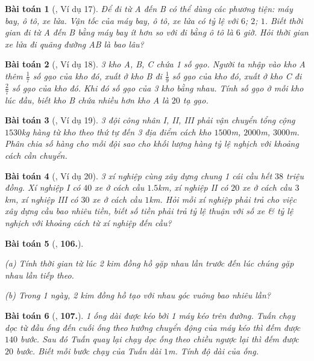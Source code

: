 \documentclass{article}
\numberwithin{equation}{section}
\newtheorem{baitoan}{Bài toán}
\begin{document}
\begin{baitoan}[\cite{Binh_Toan_7_tap_1}, Ví dụ 17]
	Để đi từ A đến B có thể dùng các phương tiện: máy bay, ô tô, xe lửa. Vận tốc của máy bay, ô tô, xe lửa có tỷ lệ với $6$; $2$; $1$. Biết thời gian đi từ A đến B bằng máy bay ít hơn so với đi bằng ô tô là $6$ giờ. Hỏi thời gian xe lửa đi quãng đường AB là bao lâu?
\end{baitoan}

\begin{baitoan}[\cite{Binh_Toan_7_tap_1}, Ví dụ 18]
	3 kho A, B, C chứa 1 số gạo. Người ta nhập vào kho A thêm $\frac{1}{7}$ số gạo của kho đó, xuất ở kho B đi $\frac{1}{9}$ số gạo của kho đó, xuất ở kho C đi $\frac{2}{7}$ số gạo của kho đó. Khi đó số gạo của 3 kho bằng nhau. Tính số gạo ở mỗi kho lúc đầu, biết kho B chứa nhiều hơn kho A là $20$ tạ gạo.
\end{baitoan}

\begin{baitoan}[\cite{Binh_Toan_7_tap_1}, Ví dụ 19]
	3 đội công nhân I, II, III phải vận chuyển tổng cộng $1530$\emph{kg} hàng từ kho theo thứ tự đến 3 địa điểm cách kho $1500$\emph{m}, $2000$\emph{m}, $3000$\emph{m}. Phân chia số hàng cho mỗi đội sao cho khối lượng hàng tỷ lệ nghịch với khoảng cách cần chuyển.
\end{baitoan}

\begin{baitoan}[\cite{Binh_Toan_7_tap_1}, Ví dụ 20]
	3 xí nghiệp cùng xây dựng chung 1 cái cầu hết $38$ triệu đồng. Xí nghiệp I có $40$ xe ở cách cầu $1.5$\emph{km}, xí nghiệp II có $20$ xe ở cách cầu $3$\emph{km}, xí nghiệp III có $30$ xe ở cách cầu $1$\emph{km}. Hỏi mỗi xí nghiệp phải trả cho việc xây dựng cầu bao nhiêu tiền, biết số tiền phải trả tỷ lệ thuận với số xe \& tỷ lệ nghịch với khoảng cách từ xí nghiệp đến cầu?
\end{baitoan}

\begin{baitoan}[\cite{Binh_Toan_7_tap_1}, \textbf{106.}]
	\begin{enumerate*}
		\item[(a)] Tính thời gian từ lúc 2 kim đồng hồ gặp nhau lần trước đến lúc chúng gặp nhau lần tiếp theo.
		\item[(b)] Trong 1 ngày, 2 kim đồng hồ tạo với nhau góc vuông bao nhiêu lần?
	\end{enumerate*}
\end{baitoan}

\begin{baitoan}[\cite{Binh_Toan_7_tap_1}, \textbf{107.}]
	1 ống dài được kéo bởi 1 máy kéo trên đường. Tuấn chạy dọc từ đầu ống đến cuối ống theo hướng chuyển động của máy kéo thì đếm được $140$ bước. Sau đó Tuấn quay lại chạy dọc ống theo chiều ngược lại thì đếm được $20$ bước. Biết mỗi bước chạy của Tuấn dài $1$\emph{m}. Tính độ dài của ống.
\end{baitoan}
\end{document}
